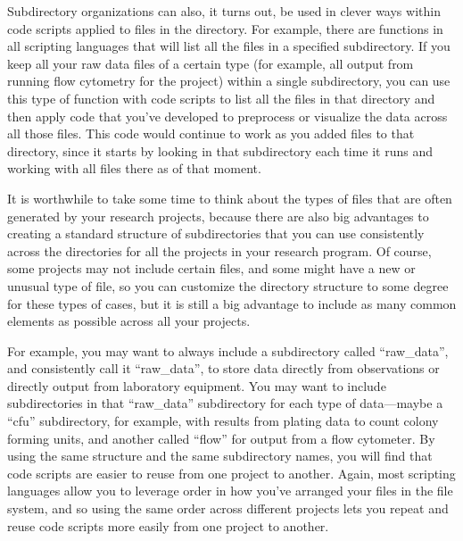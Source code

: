 \documentclass[]{tufte-book}
\begin{document}
Subdirectory organizations can also, it turns out, be used in clever ways within
code scripts applied to files in the directory. For example, there are functions
in all scripting languages that will list all the files in a specified subdirectory.
If you keep all your raw data files of a certain type (for example, all output from
running flow cytometry for the project) within a single subdirectory, you can
use this type of function with code scripts to list all the files in that directory
and then apply code that you've developed to preprocess or visualize the data
across all those files. This code would continue to work as you added files to that
directory, since it starts by looking in that subdirectory each time it runs and
working with all files there as of that moment.

It is worthwhile to take some time to think about the types of files that are
often generated by your research projects, because there are also big advantages
to creating a standard structure of subdirectories that you can use consistently
across the directories for all the projects in your research program. Of course,
some projects may not include certain files, and some might have a new or unusual
type of file, so you can customize the directory structure to some degree for these
types of cases, but it is still a big advantage to include as many common elements
as possible across all your projects.

For example, you may want to always include a subdirectory called ``raw\_data'', and
consistently call it ``raw\_data'', to store data directly from observations or
directly output from laboratory equipment. You may want to include subdirectories
in that ``raw\_data'' subdirectory for each type of data---maybe a ``cfu'' subdirectory,
for example, with results from plating data to count colony forming units, and
another called ``flow'' for output from a flow cytometer. By using the same structure
and the same subdirectory names, you will find that code scripts are easier to
reuse from one project to another. Again, most scripting languages allow you to
leverage order in how you've arranged your files in the file system, and so using
the same order across different projects lets you repeat and reuse code scripts
more easily from one project to another.
\end{document}
